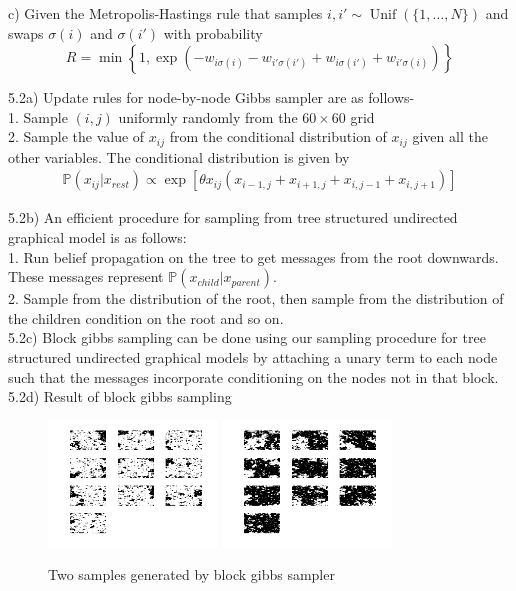 \documentclass[10pt,onecolumn,letterpaper]{article}
\begin{document}
c) Given the Metropolis-Hastings rule that samples $i,i'\sim\operatorname{Unif}(\{1,\dotsc, N\})$ and swaps $\sigma(i)$ and $\sigma(i')$ with probability
\begin{equation*}
 R = \min\left\{1, \exp(-w_{i\sigma(i)}-w_{i'\sigma(i')}+w_{i\sigma(i')}+w_{i'\sigma(i)}) \right\}
\end{equation*}

\pagebreak
5.2a) Update rules for node-by-node Gibbs sampler are as follows- \\
1. Sample $(i,j)$ uniformly randomly from the $60\times 60$ grid \\
2. Sample the value of $x_{ij}$ from the conditional distribution of $x_{ij}$ given all the other variables. The conditional distribution is given by
\begin{align*}
\mathbb{P}(x_{ij}|x_{rest}) \propto \exp \left[ \theta x_{ij}\left(x_{i-1,j} + x_{i+1,j} + x_{i,j-1} + x_{i,j+1}\right) \right]
\end{align*}

5.2b) An efficient procedure for sampling from tree structured undirected graphical model is as follows: \\
1. Run belief propagation on the tree to get messages from the root downwards. These messages represent $\mathbb{P}(x_{child}|x_{parent})$. \\
2. Sample from the distribution of the root, then sample from the distribution of the children condition on the root and so on.\\

5.2c) Block gibbs sampling can be done using our sampling procedure for tree structured undirected graphical models by attaching a unary term to each node such that the messages incorporate conditioning on the nodes not in that block.\\

5.2d) Result of block gibbs sampling
\begin{figure}[htbp]
  \centering
    \includegraphics[width=0.4\textwidth]{Images/block_1.png}
    \hfill
	\includegraphics[width=0.4\textwidth]{Images/block_3.png}
    \caption{Two samples generated by block gibbs sampler} 
\end{figure}
\end{document}
